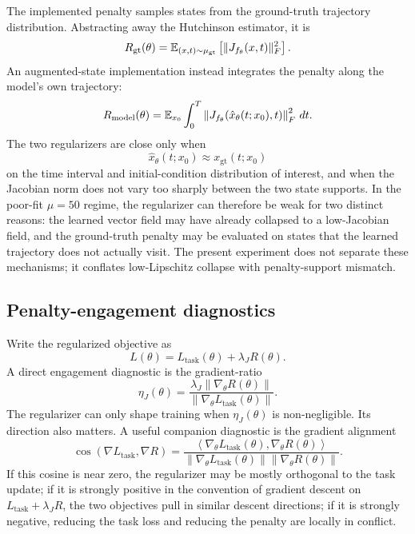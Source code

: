 The implemented penalty samples states from the ground-truth trajectory
distribution. Abstracting away the Hutchinson estimator, it is
\begin{equation}
R_{\mathrm{gt}}(\theta)
=
\mathbb{E}_{(x,t)\sim \mu_{\mathrm{gt}}}
\left[\|J_{f_\theta}(x,t)\|_F^2\right].
\label{eq:r-gt}
\end{equation}
An augmented-state implementation instead integrates the penalty along the
model's own trajectory:
\begin{equation}
R_{\mathrm{model}}(\theta)
=
\mathbb{E}_{x_0}
\int_0^T
\left\|J_{f_\theta}\!\left(\hat{x}_\theta(t;x_0),t\right)\right\|_F^2\,dt.
\label{eq:r-model}
\end{equation}
The two regularizers are close only when
\begin{equation}
\hat{x}_\theta(t;x_0) \approx x_{\mathrm{gt}}(t;x_0)
\label{eq:trajectory-fit-condition}
\end{equation}
on the time interval and initial-condition distribution of interest, and when
the Jacobian norm does not vary too sharply between the two state supports.
In the poor-fit $\mu=50$ regime, the regularizer can therefore be weak for two
distinct reasons: the learned vector field may have already collapsed to a
low-Jacobian field, and the ground-truth penalty may be evaluated on states
that the learned trajectory does not actually visit. The present experiment
does not separate these mechanisms; it conflates low-Lipschitz collapse with
penalty-support mismatch.

\subsection{Penalty-engagement diagnostics}
\label{app:engagement-criterion}

Write the regularized objective as
\begin{equation}
L(\theta)=L_{\mathrm{task}}(\theta)+\lambda_J R(\theta).
\label{eq:regularized-objective}
\end{equation}
A direct engagement diagnostic is the gradient-ratio
\begin{equation}
\eta_J(\theta)
=
\frac{\lambda_J \left\|\nabla_\theta R(\theta)\right\|}
{\left\|\nabla_\theta L_{\mathrm{task}}(\theta)\right\|}.
\label{eq:gradient-ratio}
\end{equation}
The regularizer can only shape training when $\eta_J(\theta)$ is non-negligible.
Its direction also matters. A useful companion diagnostic is the gradient
alignment
\begin{equation}
\cos(\nabla L_{\mathrm{task}},\nabla R)
=
\frac{
\left\langle \nabla_\theta L_{\mathrm{task}}(\theta),
\nabla_\theta R(\theta)\right\rangle
}{
\left\|\nabla_\theta L_{\mathrm{task}}(\theta)\right\|
\left\|\nabla_\theta R(\theta)\right\|
}.
\label{eq:gradient-cosine}
\end{equation}
If this cosine is near zero, the regularizer may be mostly orthogonal to the
task update; if it is strongly positive in the convention of gradient descent
on $L_{\mathrm{task}}+\lambda_J R$, the two objectives pull in similar
descent directions; if it is strongly negative, reducing the task loss and
reducing the penalty are locally in conflict.

